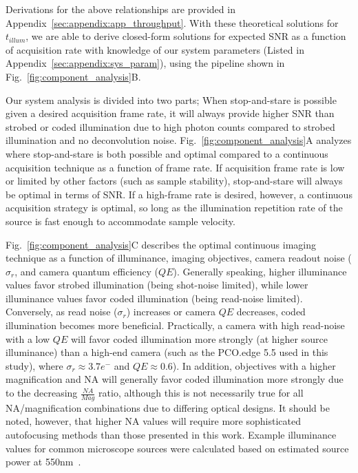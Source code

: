 Derivations for the above relationships are provided in Appendix~\ref{sec:appendix:app_throughput}. With these theoretical solutions for $t_{illum}$, we are able to derive closed-form solutions for expected SNR as a function of acquisition rate with knowledge of our system parameters (Listed in Appendix~\ref{sec:appendix:sys_param}), using the pipeline shown in Fig.~\ref{fig:component_analysis}B.

Our system analysis is divided into two parts; When stop-and-stare is possible given a desired acquisition frame rate, it will always provide higher SNR than strobed or coded illumination due to high photon counts compared to strobed illumination and no deconvolution noise. Fig.~\ref{fig:component_analysis}A analyzes where stop-and-stare is both possible and optimal compared to a continuous acquisition technique as a function of frame rate. If acquisition frame rate is low or limited by other factors (such as sample stability), stop-and-stare will always be optimal in terms of SNR. If a high-frame rate is desired, however, a continuous acquisition strategy is optimal, so long as the illumination repetition rate of the source is fast enough to accommodate sample velocity.

Fig.~\ref{fig:component_analysis}C describes the optimal continuous imaging technique as a function of illuminance, imaging objectives, camera readout noise ($\sigma_r$, and camera quantum efficiency ($QE$). Generally speaking, higher illuminance values favor strobed illumination (being shot-noise limited), while lower illuminance values favor coded illumination (being read-noise limited). Conversely, as read noise ($\sigma_r$) increases or camera $QE$ decreases, coded illumination becomes more beneficial. Practically, a camera with high read-noise with a low $QE$ will favor coded illumination more strongly (at higher source illuminance) than a high-end camera (such as the PCO.edge 5.5 used in this study), where $\sigma_r \approx 3.7 e^-$ and $QE \approx 0.6$). In addition, objectives with a higher magnification and NA will generally favor coded illumination more strongly due to the decreasing $\frac{NA}{Mag}$ ratio, although this is not necessarily true for all NA/magnification combinations due to differing optical designs. It should be noted, however, that higher NA values will require more sophisticated autofocusing methods than those presented in this work. Example illuminance values for common microscope sources were calculated based on estimated source power at 550nm~\cite{illumpower}.

